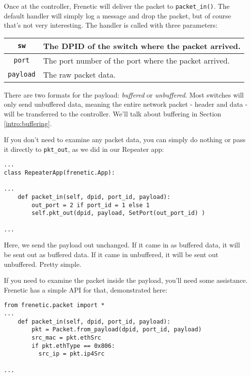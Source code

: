 Once at the controller, Frenetic will deliver the packet to \texttt{packet\_in()}. 
The default handler will simply log a message and drop the packet, but of course that's not very interesting.
The handler  is called with three parameters:

\bigskip
\begin{tabularx}{6in}{|c|X|}
\hline\hline
\texttt{sw} & The DPID of the switch where the packet arrived.
\\ \hline
\texttt{port} & The port number of the port where the packet arrived.
\\ \hline
\texttt{payload} & The raw packet data.
\\ \hline\hline
\end{tabularx}

\bigskip
There are two formats for the payload: \emph{buffered} or \emph{unbuffered}.
Most switches will only send unbuffered data, meaning the entire network packet - header and data - will be 
transferred to the controller.
We'll talk about buffering in Section \ref{intro:buffering}.

If you don't need to examine any packet data, you can simply do nothing or pass it directly to \texttt{pkt\_out},
as we did in our Repeater app:

\begin{verbatim}
...
class RepeaterApp(frenetic.App):

...
    def packet_in(self, dpid, port_id, payload):
        out_port = 2 if port_id = 1 else 1
        self.pkt_out(dpid, payload, SetPort(out_port_id) )

...
\end{verbatim}

Here, we send the payload out unchanged.  
If it came in as buffered data, it will be sent out as buffered data.
If it came in unbuffered, it will be sent out unbuffered.  
Pretty simple.

If you need to examine the packet inside the payload, you'll need some assistance.
Frenetic has a simple API for that, demonstrated here:

\begin{verbatim}
from frenetic.packet import *
...
    def packet_in(self, dpid, port_id, payload):
        pkt = Packet.from_payload(dpid, port_id, payload)
        src_mac = pkt.ethSrc
        if pkt.ethType == 0x806:
          src_ip = pkt.ip4Src

...
\end{verbatim}

